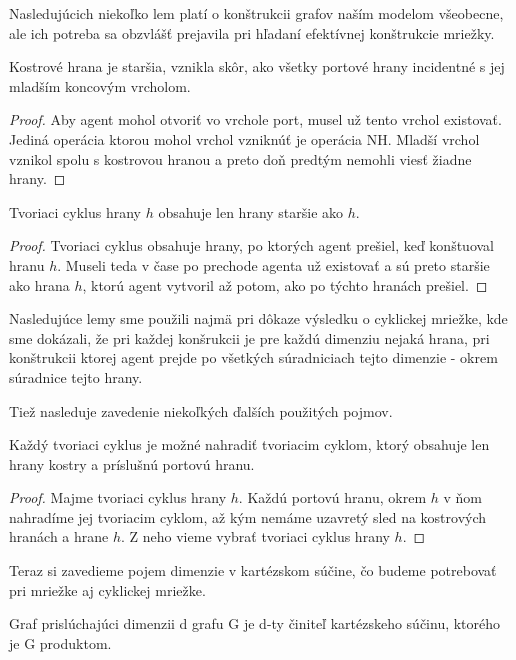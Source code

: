 Nasledujúcich niekoľko lem platí o konštrukcii grafov naším modelom
všeobecne, ale ich potreba sa obzvlášť prejavila pri hľadaní efektívnej
konštrukcie mriežky.

\begin{lem}
Kostrové hrana je staršia, vznikla skôr, ako všetky portové hrany incidentné
s jej mladším koncovým vrcholom.
\end{lem}
\begin{proof}
Aby agent mohol otvoriť vo vrchole port, musel už tento vrchol existovať.
Jediná operácia ktorou mohol vrchol vzniknúť je operácia NH. Mladší vrchol
vznikol spolu s kostrovou hranou a preto doň predtým nemohli viesť žiadne
hrany.
\end{proof}


\begin{lem}
Tvoriaci cyklus hrany $h$ obsahuje len hrany staršie ako $h$.
\end{lem}
\begin{proof}
Tvoriaci cyklus obsahuje hrany, po ktorých agent prešiel, keď konštuoval
hranu $h$. Museli teda v čase po prechode agenta už existovať a sú preto 
staršie ako hrana $h$, ktorú agent vytvoril až potom, ako po týchto hranách
prešiel.
\end{proof}

Nasledujúce lemy sme použili najmä pri dôkaze výsledku o cyklickej mriežke,
kde sme dokázali, že pri každej konšrukcii je pre každú dimenziu nejaká
hrana, pri konštrukcii ktorej agent prejde po všetkých súradniciach tejto
dimenzie - okrem súradnice tejto hrany.

Tiež nasleduje zavedenie niekoľkých ďalších použitých pojmov.

\begin{lem}
\label{cyklus}
Každý tvoriaci cyklus je možné nahradiť tvoriacim cyklom, ktorý obsahuje len
hrany kostry a príslušnú portovú hranu.
\end{lem}
\begin{proof}
Majme tvoriaci cyklus hrany $h$. Každú portovú hranu, okrem $h$  v ňom nahradíme 
jej tvoriacim
cyklom, až kým nemáme uzavretý sled na kostrových hranách a hrane $h$. Z
neho vieme vybrať tvoriaci cyklus hrany $h$.
\end{proof}


Teraz si zavedieme pojem dimenzie v kartézskom súčine, čo budeme potrebovať
pri mriežke aj cyklickej mriežke.

\begin{ozn}
Graf prislúchajúci dimenzii d grafu G je d-ty činiteľ kartézskeho súčinu, 
ktorého je G produktom.
\end{ozn}

